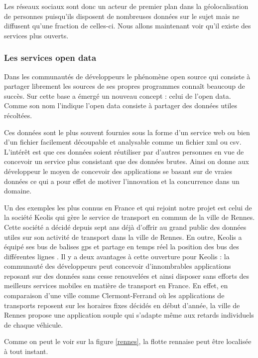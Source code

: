 Les réseaux sociaux sont donc un acteur de premier plan dans la géolocalisation de personnes puisqu’ils disposent de nombreuses données sur le sujet mais ne diffusent qu’une fraction de celles-ci. Nous allons maintenant voir qu’il existe des services plus ouverts.

\subsubsection{Les services open data}

Dans les communautés de développeurs le phénomène open source qui consiste à partager librement les sources de ses propres programmes connaît beaucoup de succès. Sur cette base a émergé un nouveau concept : celui de l’open data. Comme son nom l’indique l’open data consiste à partager des données utiles récoltées.

Ces données sont le plus souvent fournies sous la forme d’un service web ou bien d’un fichier facilement découpable et analysable comme un fichier xml ou csv. L’intérêt est que ces données soient réutiliser par d’autres personnes en vue de concevoir un service plus consistant que des données brutes. Ainsi on donne aux développeur le moyen de concevoir des applications se basant sur de vraies données ce qui a pour effet de motiver l’innovation et la concurrence dans un domaine.

Un des exemples les plus connus en France et qui rejoint notre projet est celui de la société Keolis qui gère le service de transport en commun de la ville de Rennes. Cette société a décidé depuis sept ans déjà d’offrir au grand public des données utiles sur son activité de transport dans la ville de Rennes. En outre, Keolis a équipé ses bus de balises gps et partage en temps réel la position des bus des différentes lignes \cite{stardataexplore}. Il y a deux avantages à cette ouverture pour Keolis : la communauté des développeurs peut concevoir d’innombrables applications reposant sur des données sans cesse renouvelées et ainsi disposer sans efforts des meilleurs services mobiles en matière de transport en France. En effet, en comparaison d’une ville comme Clermont-Ferrand où les applications de transports reposent sur les horaires fixes décidés en début d’année, la ville de Rennes propose une application souple qui s’adapte même aux retards individuels de chaque véhicule.

Comme on peut le voir sur la figure \ref{rennes}, la flotte rennaise peut être localisée à tout instant.

